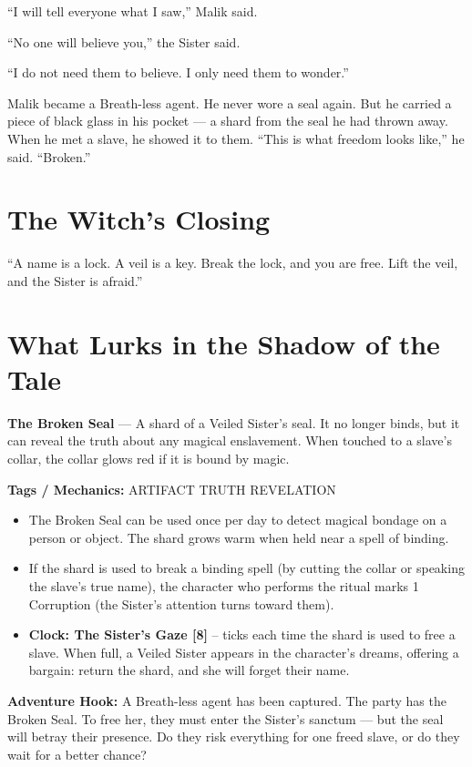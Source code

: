 \documentclass[10pt,twoside]{book}
\newcommand{\tag}[1]{\textsc{#1}}
\begin{document}
``I will tell everyone what I saw,'' Malik said.

``No one will believe you,'' the Sister said.

``I do not need them to believe. I only need them to wonder.''

Malik became a Breath-less agent. He never wore a seal again. But he carried a piece of black glass in his pocket --- a shard from the seal he had thrown away. When he met a slave, he showed it to them. ``This is what freedom looks like,'' he said. ``Broken.''

\section*{The Witch's Closing}
``A name is a lock. A veil is a key. Break the lock, and you are free. Lift the veil, and the Sister is afraid.''

\section*{What Lurks in the Shadow of the Tale}
\begin{infobox}
\textbf{The Broken Seal} --- A shard of a Veiled Sister's seal. It no longer binds, but it can reveal the truth about any magical enslavement. When touched to a slave's collar, the collar glows red if it is bound by magic.

\textbf{Tags / Mechanics:} \tag{ARTIFACT} \tag{TRUTH} \tag{REVELATION}

\begin{itemize}
\item The Broken Seal can be used once per day to detect magical bondage on a person or object. The shard grows warm when held near a spell of binding.
\item If the shard is used to break a binding spell (by cutting the collar or speaking the slave's true name), the character who performs the ritual marks 1 Corruption (the Sister's attention turns toward them).
\item \textbf{Clock: The Sister's Gaze [8]} -- ticks each time the shard is used to free a slave. When full, a Veiled Sister appears in the character's dreams, offering a bargain: return the shard, and she will forget their name.
\end{itemize}

\textbf{Adventure Hook:} A Breath-less agent has been captured. The party has the Broken Seal. To free her, they must enter the Sister's sanctum --- but the seal will betray their presence. Do they risk everything for one freed slave, or do they wait for a better chance?
\end{infobox}
\end{document}
